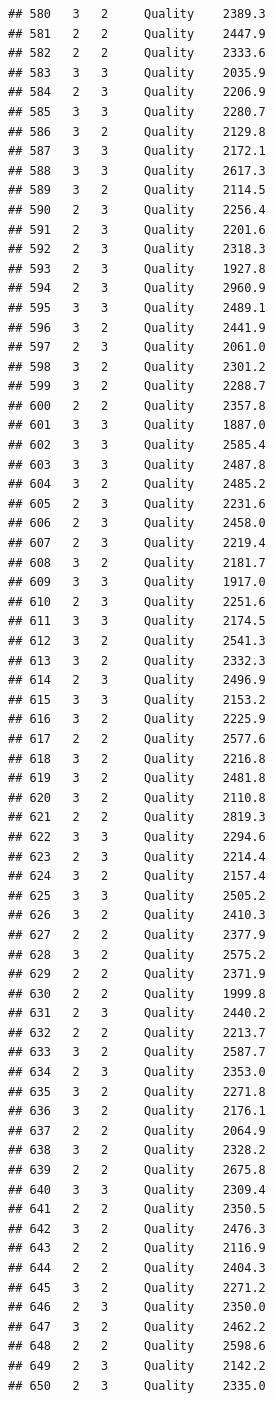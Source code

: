 \documentclass[12pt,]{krantz}
\theoremstyle{definition}
\theoremstyle{definition}
\theoremstyle{remark}
\begin{document}
\begin{verbatim}
## 580   3   2     Quality    2389.3
## 581   2   2     Quality    2447.9
## 582   2   2     Quality    2333.6
## 583   3   3     Quality    2035.9
## 584   2   3     Quality    2206.9
## 585   3   3     Quality    2280.7
## 586   3   2     Quality    2129.8
## 587   3   3     Quality    2172.1
## 588   3   3     Quality    2617.3
## 589   3   2     Quality    2114.5
## 590   2   3     Quality    2256.4
## 591   2   3     Quality    2201.6
## 592   2   3     Quality    2318.3
## 593   2   3     Quality    1927.8
## 594   2   3     Quality    2960.9
## 595   3   3     Quality    2489.1
## 596   3   2     Quality    2441.9
## 597   2   3     Quality    2061.0
## 598   3   2     Quality    2301.2
## 599   3   2     Quality    2288.7
## 600   2   2     Quality    2357.8
## 601   3   3     Quality    1887.0
## 602   3   3     Quality    2585.4
## 603   3   3     Quality    2487.8
## 604   3   2     Quality    2485.2
## 605   2   3     Quality    2231.6
## 606   2   3     Quality    2458.0
## 607   2   3     Quality    2219.4
## 608   3   2     Quality    2181.7
## 609   3   3     Quality    1917.0
## 610   2   3     Quality    2251.6
## 611   3   3     Quality    2174.5
## 612   3   2     Quality    2541.3
## 613   3   2     Quality    2332.3
## 614   2   3     Quality    2496.9
## 615   3   3     Quality    2153.2
## 616   3   2     Quality    2225.9
## 617   2   2     Quality    2577.6
## 618   3   2     Quality    2216.8
## 619   3   2     Quality    2481.8
## 620   3   2     Quality    2110.8
## 621   2   2     Quality    2819.3
## 622   3   3     Quality    2294.6
## 623   2   3     Quality    2214.4
## 624   3   2     Quality    2157.4
## 625   3   3     Quality    2505.2
## 626   3   2     Quality    2410.3
## 627   2   2     Quality    2377.9
## 628   3   2     Quality    2575.2
## 629   2   2     Quality    2371.9
## 630   2   2     Quality    1999.8
## 631   2   3     Quality    2440.2
## 632   2   2     Quality    2213.7
## 633   3   2     Quality    2587.7
## 634   2   3     Quality    2353.0
## 635   3   2     Quality    2271.8
## 636   3   2     Quality    2176.1
## 637   2   2     Quality    2064.9
## 638   3   2     Quality    2328.2
## 639   2   2     Quality    2675.8
## 640   3   3     Quality    2309.4
## 641   2   2     Quality    2350.5
## 642   3   2     Quality    2476.3
## 643   2   2     Quality    2116.9
## 644   2   2     Quality    2404.3
## 645   3   2     Quality    2271.2
## 646   2   3     Quality    2350.0
## 647   3   2     Quality    2462.2
## 648   2   2     Quality    2598.6
## 649   2   3     Quality    2142.2
## 650   2   3     Quality    2335.0

\end{verbatim}
\end{document}
